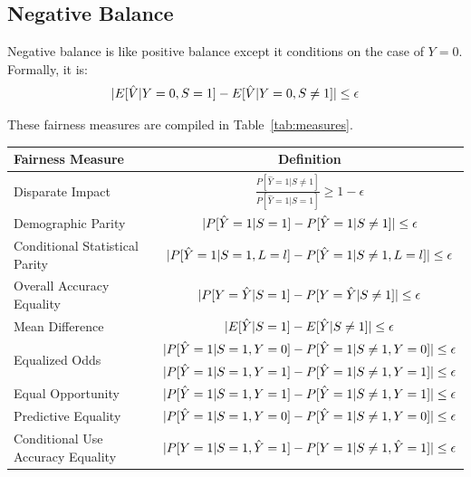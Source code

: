 \documentclass[conference]{IEEEtran}
\begin{document}
\subsection{Negative Balance}
Negative balance \cite{kleinberg2016inherent} is like positive balance except it conditions on the case of $Y = 0$. Formally, it is:
\begin{align*}
    \lvert E[\hat{V} | Y = 0, S = 1] - E[\hat{V} | Y = 0, S \neq 1]\rvert \leq \epsilon
\end{align*}

These fairness measures are compiled in Table~\ref{tab:measures}.

\begin{table}[h]
    \centering
    \begin{tabular}{|l|c|} %
        \hline
        \textbf{Fairness Measure} & \textbf{Definition} \\
        \hline
Disparate Impact & $\frac{P[\hat{Y} = 1 | S \neq 1]}{P[\hat{Y} = 1 | S = 1]} \geq 1 - \epsilon$ \\
\hline
Demographic Parity & $\lvert P[\hat{Y} = 1 | S = 1] - P[\hat{Y} = 1 | S \neq 1]\rvert \leq \epsilon$ \\
\hline
Conditional Statistical Parity & $\lvert P[\hat{Y} = 1 | S = 1, L = l] - P[\hat{Y} = 1 | S \neq 1, L = l]\rvert \leq \epsilon$ \\
\hline
Overall Accuracy Equality & $\lvert P[Y = \hat{Y} | S = 1] - P[Y = \hat{Y} | S \neq 1]\rvert \leq \epsilon$ \\
\hline
Mean Difference & $\lvert E[\hat{Y}|S = 1] - E[\hat{Y}|S \neq 1]\rvert \leq \epsilon$ \\
\hline
\multirow{2}{*}{Equalized Odds} & $\lvert P[\hat{Y} = 1 | S = 1, Y = 0] - P[\hat{Y} = 1 | S \neq 1, Y = 0]\rvert \leq \epsilon$ \\
\cline{2-2}
                                & $\lvert P[\hat{Y} = 1 | S = 1, Y = 1] - P[\hat{Y} = 1 | S \neq 1, Y = 1]\rvert \leq \epsilon$ \\
\hline
Equal Opportunity & $\lvert P[\hat{Y} = 1 | S = 1, Y = 1] - P[\hat{Y} = 1 | S \neq 1, Y = 1]\rvert \leq \epsilon$ \\
\hline
Predictive Equality & $\lvert P[\hat{Y} = 1 | S = 1, Y = 0] - P[\hat{Y} = 1 | S \neq 1, Y = 0]\rvert \leq \epsilon$ \\
\hline
\multirow{2}{*}{Conditional Use Accuracy Equality} & $\lvert P[Y = 1 | S = 1, \hat{Y} = 1] - P[Y = 1 | S \neq 1, \hat{Y} = 1]\rvert \leq \epsilon$ \\

\end{tabular}
\end{table}
\end{document}
